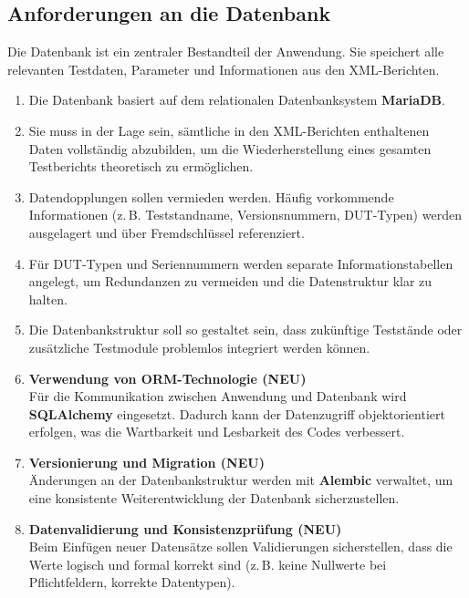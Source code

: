 \subsection{Anforderungen an die Datenbank}
\label{subsec:anforderungen-an-die-datenbank}

Die Datenbank ist ein zentraler Bestandteil der Anwendung.
Sie speichert alle relevanten Testdaten, Parameter und Informationen aus den XML-Berichten.

\begin{enumerate}
  \item Die Datenbank basiert auf dem relationalen Datenbanksystem \textbf{MariaDB}.

  \item Sie muss in der Lage sein, sämtliche in den XML-Berichten enthaltenen Daten vollständig abzubilden,
  um die Wiederherstellung eines gesamten Testberichts theoretisch zu ermöglichen.

  \item Datendopplungen sollen vermieden werden.
  Häufig vorkommende Informationen (z.\,B. Teststandname, Versionsnummern, DUT-Typen) werden ausgelagert und über Fremdschlüssel referenziert.

  \item Für DUT-Typen und Seriennummern werden separate Informationstabellen angelegt,
  um Redundanzen zu vermeiden und die Datenstruktur klar zu halten.

  \item Die Datenbankstruktur soll so gestaltet sein, dass zukünftige Teststände oder zusätzliche Testmodule problemlos integriert werden können.

  \item \textbf{Verwendung von ORM-Technologie \textbf{(NEU)}} \\
  Für die Kommunikation zwischen Anwendung und Datenbank wird \textbf{SQLAlchemy} eingesetzt.
  Dadurch kann der Datenzugriff objektorientiert erfolgen, was die Wartbarkeit und Lesbarkeit des Codes verbessert.

  \item \textbf{Versionierung und Migration \textbf{(NEU)}} \\
  Änderungen an der Datenbankstruktur werden mit \textbf{Alembic} verwaltet,
  um eine konsistente Weiterentwicklung der Datenbank sicherzustellen.

  \item \textbf{Datenvalidierung und Konsistenzprüfung \textbf{(NEU)}} \\
  Beim Einfügen neuer Datensätze sollen Validierungen sicherstellen,
  dass die Werte logisch und formal korrekt sind (z.\,B. keine Nullwerte bei Pflichtfeldern, korrekte Datentypen).
\end{enumerate}

